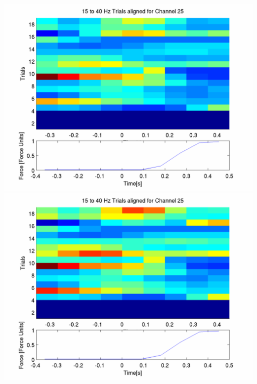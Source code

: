 \documentclass[12pt]{article}
\begin{document}
\includegraphics[scale=0.2]{noCAR/plot_2_aligned_trials.png}
\includegraphics[scale=0.2]{WithCAR/plot_2_aligned_trials.png}
\end{document}
